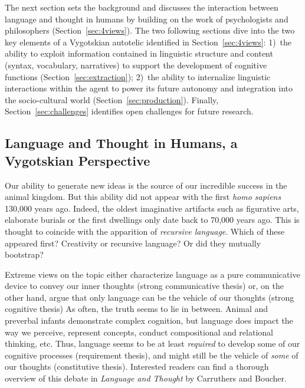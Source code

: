 The next section sets the background and discusses the interaction between language and thought in humans by building on the work of psychologists and philosophers (Section~\ref{sec:4views}). The two following sections dive into the two key elements of a Vygotskian autotelic \ai identified in Section~\ref{sec:4views}: 1)~the ability to exploit information contained in linguistic structure and content (syntax, vocabulary, narratives) to support the development of cognitive functions (Section~\ref{sec:extraction}); 2)~the ability to internalize linguistic interactions within the agent to power its future autonomy and integration into the socio-cultural world (Section~\ref{sec:production}). Finally, Section~\ref{sec:challenges} identifies open challenges for future research.



\subsection{Language and Thought in Humans, a Vygotskian Perspective}
\label{sec:language_and_though}
Our ability to generate new ideas is the source of our incredible success in the animal kingdom. But this ability did not appear with the first \textit{homo sapiens} 130,000 years ago. Indeed, the oldest imaginative artifacts such as figurative arts, elaborate burials or the first dwellings only date back to 70,000 years ago.\cite{harari_sapiens_2014, vyshedskiy_language_2019} This is thought to coincide with the apparition of \textit{recursive language}.\cite{goldberg1999emergence, vyshedskiy_language_2019, hoffmann_construction_2020} Which of these appeared first? Creativity or recursive language? Or did they mutually bootstrap?

Extreme views on the topic either characterize language as a pure communicative device to convey our inner thoughts (strong communicative thesis)\cite{chomsky_syntactic_1957,fodor1975language} or, on the other hand, argue that only language can be the vehicle of our thoughts (strong cognitive thesis)\cite{wittgenstein1953philosophical, mcdowell1996mind} As often, the truth seems to lie in between. Animal and preverbal infants demonstrate complex cognition,\cite{sperber1995causal, allen1999species} but language does impact the way we perceive,\cite{waxman_words_1995, yoshida_sound_2003} represent concepts,\cite{lakoff2008metaphors} conduct compositional and relational thinking,\cite{gentner2002relational, gentner_analogy_2017, vyshedskiy_language_2019} etc. Thus, language seems to be at least \textit{required} to develop some of our cognitive processes (requirement thesis), and might still be the vehicle of \textit{some} of our thoughts (constitutive thesis).\cite{carruthers_language_1998} Interested readers can find a thorough overview of this debate in \textit{Language and Thought} by Carruthers and Boucher.\cite{carruthers_language_1998}

